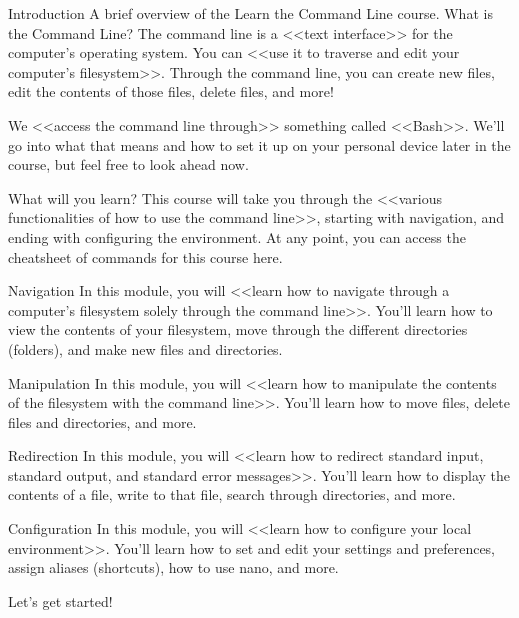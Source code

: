 Introduction
        A brief overview of the Learn the Command Line course.
What is the Command Line?
        The command line is a <<text interface>> for the computer’s operating system. You can <<use it to traverse and edit your computer’s filesystem>>. Through the command line, you can create new files, edit the contents of those files, delete files, and more!

        We <<access the command line through>> something called <<Bash>>. We’ll go into what that means and how to set it up on your personal device later in the course, but feel free to look ahead now.

What will you learn?
        This course will take you through the <<various functionalities of how to use the command line>>, starting with navigation, and ending with configuring the environment. At any point, you can access the cheatsheet of commands for this course here.

    Navigation
        In this module, you will <<learn how to navigate through a computer’s filesystem solely through the command line>>. You’ll learn how to view the contents of your filesystem, move through the different directories (folders), and make new files and directories.

    Manipulation
        In this module, you will <<learn how to manipulate the contents of the filesystem with the command line>>. You’ll learn how to move files, delete files and directories, and more.

    Redirection
        In this module, you will <<learn how to redirect standard input, standard output, and standard error messages>>. You’ll learn how to display the contents of a file, write to that file, search through directories, and more.

    Configuration
        In this module, you will <<learn how to configure your local environment>>. You’ll learn how to set and edit your settings and preferences, assign aliases (shortcuts), how to use nano, and more.

        Let’s get started!